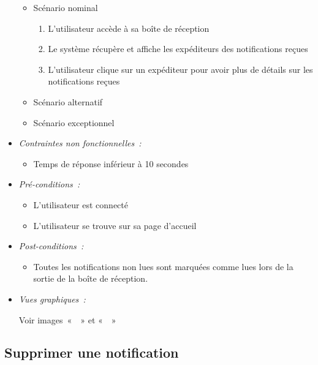 \begin{itemize}
    \begin{itemize}
        \item Scénario nominal
        \begin{enumerate}
            \item L'utilisateur accède à sa boîte de réception
            \item Le système récupère et affiche les expéditeurs des notifications reçues
            \item L'utilisateur clique sur un expéditeur pour avoir plus de détails sur les notifications reçues
        \end{enumerate}
        \item Scénario alternatif
        \item Scénario exceptionnel
    \end{itemize}

\item \textit{Contraintes non fonctionnelles~:}

    \begin{itemize}
        \item Temps de réponse inférieur à 10 secondes
    \end{itemize}

\item \textit{Pré-conditions~:}

    \begin{itemize}
        \item L'utilisateur est connecté
        \item L'utilisateur se trouve sur sa page d'accueil
    \end{itemize}

\item \textit{Post-conditions~:}

    \begin{itemize}
        \item Toutes les notifications non lues sont marquées comme lues lors de la sortie de la boîte de réception.
    \end{itemize}
    
\item \textit{Vues graphiques~:}

Voir images~«~~» et «~~»

\end{itemize}

\subsection{Supprimer une notification}\label{subsec:supprimer-une-notification}

